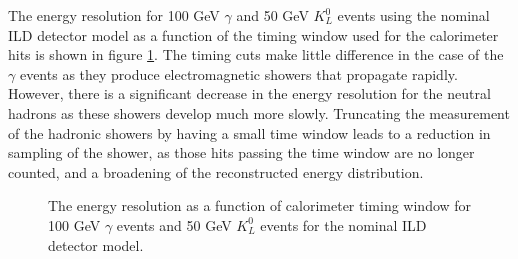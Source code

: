 The energy resolution for 100 GeV $\gamma$ and 50 GeV $K^{0}_{L}$ events using the nominal ILD detector model as a function of the timing window used for the calorimeter hits is shown in figure \ref{fig:ertimingcuts}.  The timing cuts make little difference in the case of the $\gamma$ events as they produce electromagnetic showers that propagate rapidly.  However, there is a significant decrease in the energy resolution for the neutral hadrons as these showers develop much more slowly.  Truncating the measurement of the hadronic showers by having a small time window leads to a reduction in sampling of the shower, as those hits passing the time window are no longer counted, and a broadening of the reconstructed energy distribution.  

\begin{figure}
\caption[The energy resolution as a function of calorimeter timing window for \protect{} 100 GeV $\gamma$ events and \protect{} 50 GeV $K^{0}_{L}$ events for the nominal ILD detector model.]{The energy resolution as a function of calorimeter timing window for \protect{} 100 GeV $\gamma$ events and \protect{} 50 GeV $K^{0}_{L}$ events for the nominal ILD detector model.}
\label{fig:ertimingcuts}
\end{figure}

